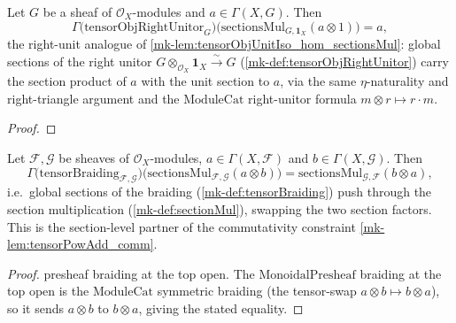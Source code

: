 \begin{lemma}\label{mk-lem:tensorObjRightUnitor_hom_sectionsMul}
  \leanok

  Let \(G\) be a sheaf of \(\mathcal{O}_X\)-modules and \(a \in \Gamma(X, G)\).
  Then
  \[
    \Gamma\bigl(\mathrm{tensorObjRightUnitor}_G\bigr)
      \bigl(\mathrm{sectionsMul}_{G, \mathbf{1}_X}(a \otimes 1)\bigr) = a,
  \]
  the right-unit analogue of \ref{mk-lem:tensorObjUnitIso_hom_sectionsMul}: global
  sections of the right unitor
  \(G \otimes_{\mathcal{O}_X} \mathbf{1}_X \xrightarrow{\sim} G\)
  (\ref{mk-def:tensorObjRightUnitor}) carry the section product of \(a\) with the
  unit section to \(a\), via the same \(\eta\)-naturality and right-triangle
  argument and the \(\mathrm{ModuleCat}\) right-unitor formula
  \(m \otimes r \mapsto r \cdot m\).
\end{lemma}

\begin{proof}
  \leanok
  \end{proof}

\begin{lemma}\label{mk-lem:tensorBraiding_hom_sectionsMul}
  \leanok

  Let \(\mathcal{F}, \mathcal{G}\) be sheaves of \(\mathcal{O}_X\)-modules,
  \(a \in \Gamma(X,\mathcal{F})\) and \(b \in \Gamma(X,\mathcal{G})\). Then
  \[
    \Gamma\bigl(\mathrm{tensorBraiding}_{\mathcal{F},\mathcal{G}}\bigr)
      \bigl(\mathrm{sectionsMul}_{\mathcal{F},\mathcal{G}}(a \otimes b)\bigr)
      = \mathrm{sectionsMul}_{\mathcal{G},\mathcal{F}}(b \otimes a),
  \]
  i.e.\ global sections of the braiding (\ref{mk-def:tensorBraiding}) push through
  the section multiplication (\ref{mk-def:sectionMul}), swapping the two section
  factors. This is the section-level partner of the commutativity constraint
  \ref{mk-lem:tensorPowAdd_comm}.
\end{lemma}

\begin{proof}
  \leanok
  presheaf braiding at the top open. The
  \(\mathrm{MonoidalPresheaf}\) braiding at the top open is the
  \(\mathrm{ModuleCat}\) symmetric braiding (the tensor-swap
  \(a \otimes b \mapsto b \otimes a\)), so it sends \(a \otimes b\) to
  \(b \otimes a\), giving the stated equality.
\end{proof}

